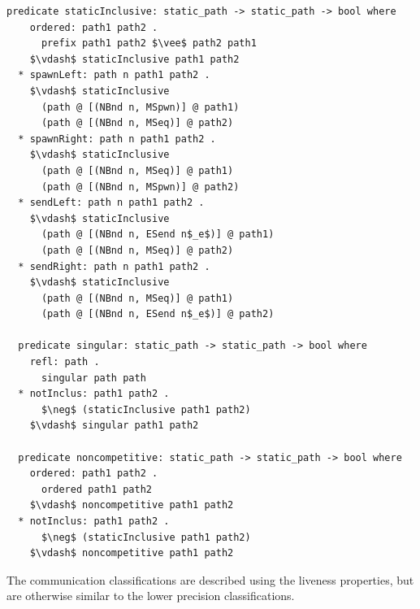 \documentclass[letterpaper, 11pt]{extarticle}
\begin{document}
\begin{lstlisting}[language=logic, mathescape]
  predicate staticInclusive: static_path -> static_path -> bool where
    ordered: path1 path2 .
      prefix path1 path2 $\vee$ path2 path1
    $\vdash$ staticInclusive path1 path2
  * spawnLeft: path n path1 path2 .
    $\vdash$ staticInclusive
      (path @ [(NBnd n, MSpwn)] @ path1)
      (path @ [(NBnd n, MSeq)] @ path2)
  * spawnRight: path n path1 path2 .
    $\vdash$ staticInclusive
      (path @ [(NBnd n, MSeq)] @ path1)
      (path @ [(NBnd n, MSpwn)] @ path2)
  * sendLeft: path n path1 path2 .
    $\vdash$ staticInclusive
      (path @ [(NBnd n, ESend n$_e$)] @ path1)
      (path @ [(NBnd n, MSeq)] @ path2)
  * sendRight: path n path1 path2 .
    $\vdash$ staticInclusive
      (path @ [(NBnd n, MSeq)] @ path1)
      (path @ [(NBnd n, ESend n$_e$)] @ path2)

  predicate singular: static_path -> static_path -> bool where
    refl: path .
      singular path path
  * notInclus: path1 path2 .
      $\neg$ (staticInclusive path1 path2)
    $\vdash$ singular path1 path2

  predicate noncompetitive: static_path -> static_path -> bool where
    ordered: path1 path2 . 
      ordered path1 path2
    $\vdash$ noncompetitive path1 path2
  * notInclus: path1 path2 .
      $\neg$ (staticInclusive path1 path2)
    $\vdash$ noncompetitive path1 path2
  \end{lstlisting}

The communication classifications are described using the liveness properties, but
are otherwise similar to the lower precision classifications.
\end{document}
